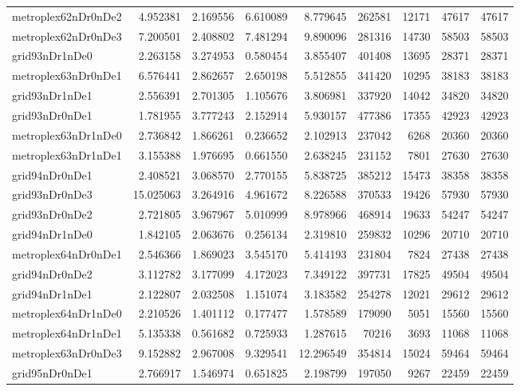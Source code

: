 \begin{longtable}{|l|r|r|r|r|r|r|r|r|}
metroplex62nDr0nDe2 & 4.952381 & 2.169556 & 6.610089 & 8.779645 & 262581 & 12171 & 47617 & 47617 \\
metroplex62nDr0nDe3 & 7.200501 & 2.408802 & 7.481294 & 9.890096 & 281316 & 14730 & 58503 & 58503 \\
grid93nDr1nDe0 & 2.263158 & 3.274953 & 0.580454 & 3.855407 & 401408 & 13695 & 28371 & 28371 \\
metroplex63nDr0nDe1 & 6.576441 & 2.862657 & 2.650198 & 5.512855 & 341420 & 10295 & 38183 & 38183 \\
grid93nDr1nDe1 & 2.556391 & 2.701305 & 1.105676 & 3.806981 & 337920 & 14042 & 34820 & 34820 \\
grid93nDr0nDe1 & 1.781955 & 3.777243 & 2.152914 & 5.930157 & 477386 & 17355 & 42923 & 42923 \\
metroplex63nDr1nDe0 & 2.736842 & 1.866261 & 0.236652 & 2.102913 & 237042 & 6268 & 20360 & 20360 \\
metroplex63nDr1nDe1 & 3.155388 & 1.976695 & 0.661550 & 2.638245 & 231152 & 7801 & 27630 & 27630 \\
grid94nDr0nDe1 & 2.408521 & 3.068570 & 2.770155 & 5.838725 & 385212 & 15473 & 38358 & 38358 \\
grid93nDr0nDe3 & 15.025063 & 3.264916 & 4.961672 & 8.226588 & 370533 & 19426 & 57930 & 57930 \\
grid93nDr0nDe2 & 2.721805 & 3.967967 & 5.010999 & 8.978966 & 468914 & 19633 & 54247 & 54247 \\
grid94nDr1nDe0 & 1.842105 & 2.063676 & 0.256134 & 2.319810 & 259832 & 10296 & 20710 & 20710 \\
metroplex64nDr0nDe1 & 2.546366 & 1.869023 & 3.545170 & 5.414193 & 231804 & 7824 & 27438 & 27438 \\
grid94nDr0nDe2 & 3.112782 & 3.177099 & 4.172023 & 7.349122 & 397731 & 17825 & 49504 & 49504 \\
grid94nDr1nDe1 & 2.122807 & 2.032508 & 1.151074 & 3.183582 & 254278 & 12021 & 29612 & 29612 \\
metroplex64nDr1nDe0 & 2.210526 & 1.401112 & 0.177477 & 1.578589 & 179090 & 5051 & 15560 & 15560 \\
metroplex64nDr1nDe1 & 5.135338 & 0.561682 & 0.725933 & 1.287615 & 70216 & 3693 & 11068 & 11068 \\
metroplex63nDr0nDe3 & 9.152882 & 2.967008 & 9.329541 & 12.296549 & 354814 & 15024 & 59464 & 59464 \\
grid95nDr0nDe1 & 2.766917 & 1.546974 & 0.651825 & 2.198799 & 197050 & 9267 & 22459 & 22459 \\

\end{longtable}
